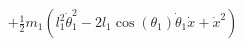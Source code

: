 \documentclass[preview]{standalone}
\begin{document}
\begin{align*}
+ \frac{1}{2} m_{1} \left(l_{1}^{2} \dot{\theta}_{1}^{2} - 2 l_{1} \operatorname{cos}\left(\theta_{1}\right) \dot{\theta}_{1} \dot{x} + \dot{x}^{2}\right)
\end{align*}
\end{document}
